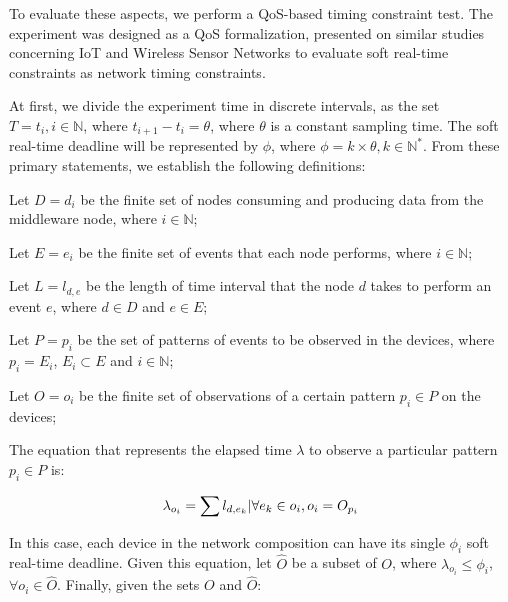 To evaluate these aspects, we perform a QoS-based timing constraint test. The experiment was designed as a QoS formalization, presented on similar studies concerning IoT and Wireless Sensor Networks \cite{silva2019analyzing} to evaluate soft real-time constraints as network timing constraints.

At first, we divide the experiment time in discrete intervals, as the set $T = t_i,  i \in \mathbb{N}$, where $t_{i+1} - t_i = \theta$, where $\theta$ is a constant sampling time. The soft real-time deadline will be represented by $\phi$, where $\phi = k \times \theta, k \in \mathbb{N}^*$. From these primary statements, we establish the following definitions:

\begin{definition} 
    Let $D = d_i$ be the finite set of nodes consuming and producing data from the middleware node, where $i \in \mathbb{N}$;
\end{definition}

\begin{definition}
    Let $E = e_i$ be the finite set of events that each node performs, where $i \in \mathbb{N}$;
\end{definition}

\begin{definition}
    Let $L = l_{d,e}$ be the length of time interval that the node $d$ takes to perform an event $e$, where $d \in D$ and $e \in E$;
\end{definition}

\begin{definition}
    Let $P = p_{i}$ be the set of patterns of events to be observed in the devices, where $p_i = E_i$, $E_i \subset E$ and $i \in \mathbb{N}$;
\end{definition}

\begin{definition}
    Let $O = o_{i}$ be the finite set of observations of a certain pattern $p_i \in P$ on the devices;
\end{definition}

The equation that represents the elapsed time $\lambda$ to observe a particular pattern $p_i \in P$ is:

\begin{equation}
    \lambda_{o_i} = \sum l_{d,e_k} | \forall e_k \in o_i, o_i = O_{p_i}
\vspace{0.2cm}
\end{equation}

In this case, each device in the network composition can have its single $\phi_i$ soft real-time deadline. Given this equation, let $\hat{O}$ be a subset of $O$, where $\lambda_{o_i} \leq \phi_i$, $\forall o_i \in \hat{O}$. Finally, given the sets $O$ and $\hat{O}$:

